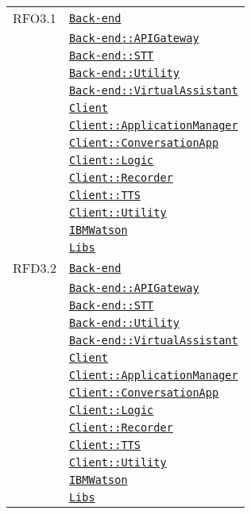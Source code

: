 \begin{longtable}{|>{\centering}m{3cm}|m{10cm}<{\centering}|}
RFO3.1 & \hyperref[Back-end]{\texttt{Back-end}}\\
& \hyperref[Back-end::APIGateway]{\texttt{Back-end::APIGateway}}\\
& \hyperref[Back-end::STT]{\texttt{Back-end::STT}}\\
& \hyperref[Back-end::Utility]{\texttt{Back-end::Utility}}\\
& \hyperref[Back-end::VirtualAssistant]{\texttt{Back-end::VirtualAssistant}}\\
& \hyperref[Client]{\texttt{Client}}\\
& \hyperref[Client::ApplicationManager]{\texttt{Client::ApplicationManager}}\\
& \hyperref[Client::ConversationApp]{\texttt{Client::ConversationApp}}\\
& \hyperref[Client::Logic]{\texttt{Client::Logic}}\\
& \hyperref[Client::Recorder]{\texttt{Client::Recorder}}\\
& \hyperref[Client::TTS]{\texttt{Client::TTS}}\\
& \hyperref[Client::Utility]{\texttt{Client::Utility}}\\
& \hyperref[IBMWatson]{\texttt{IBMWatson}}\\
& \hyperref[Libs]{\texttt{Libs}}\\ \hline

RFD3.2 & \hyperref[Back-end]{\texttt{Back-end}}\\
& \hyperref[Back-end::APIGateway]{\texttt{Back-end::APIGateway}}\\
& \hyperref[Back-end::STT]{\texttt{Back-end::STT}}\\
& \hyperref[Back-end::Utility]{\texttt{Back-end::Utility}}\\
& \hyperref[Back-end::VirtualAssistant]{\texttt{Back-end::VirtualAssistant}}\\
& \hyperref[Client]{\texttt{Client}}\\
& \hyperref[Client::ApplicationManager]{\texttt{Client::ApplicationManager}}\\
& \hyperref[Client::ConversationApp]{\texttt{Client::ConversationApp}}\\
& \hyperref[Client::Logic]{\texttt{Client::Logic}}\\
& \hyperref[Client::Recorder]{\texttt{Client::Recorder}}\\
& \hyperref[Client::TTS]{\texttt{Client::TTS}}\\
& \hyperref[Client::Utility]{\texttt{Client::Utility}}\\
& \hyperref[IBMWatson]{\texttt{IBMWatson}}\\
& \hyperref[Libs]{\texttt{Libs}}\\ \hline


\end{longtable}
